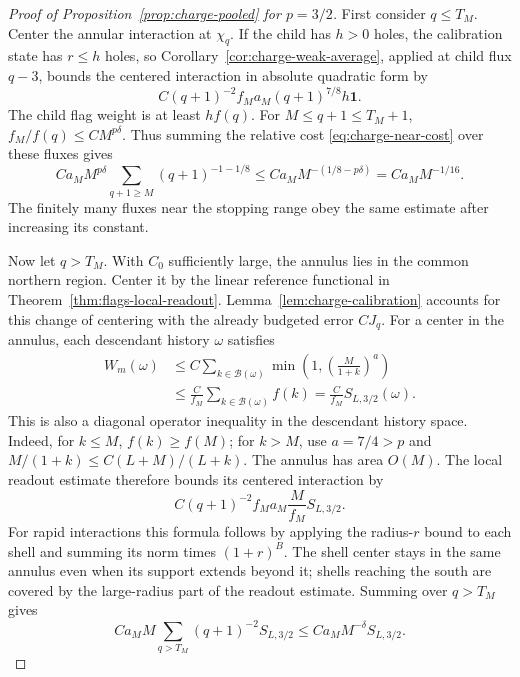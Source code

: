 \begin{proof}[Proof of Proposition~\ref{prop:charge-pooled} for $p=3/2$]
First consider $q\le T_M$.  Center the annular interaction at
$\chi_q$.  If the child has $h>0$ holes, the calibration state has
$r\le h$ holes, so Corollary~\ref{cor:charge-weak-average}, applied
at child flux $q-3$, bounds the centered interaction in absolute
quadratic form by
\begin{equation}\label{eq:charge-near-cost}
 C(q+1)^{-2}f_M a_M(q+1)^{7/8}h\mathbf1.
\end{equation}
The child flag weight is at least $hf(q)$.
For $M\le q+1\le T_M+1$,
$f_M/f(q)\le C M^{p\delta}$.  Thus summing the relative cost
\eqref{eq:charge-near-cost} over these fluxes gives
\begin{equation}\label{eq:charge-near-sum}
 C a_M M^{p\delta}\sum_{q+1\ge M}(q+1)^{-1-1/8}
 \le C a_M M^{-(1/8-p\delta)}
 =C a_M M^{-1/16}.
\end{equation}
The finitely many fluxes near the stopping range obey the same
estimate after increasing its constant.

Now let $q>T_M$.  With $C_0$ sufficiently large, the annulus lies
in the common northern region.  Center it by the linear reference
functional in Theorem~\ref{thm:flags-local-readout}.
Lemma~\ref{lem:charge-calibration} accounts for this change of
centering with the already budgeted error $CJ_q$.
For a center in the annulus, each descendant history $\omega$ satisfies
\begin{equation}\label{eq:charge-weight-comparison}
 \begin{split}
 W_m(\omega)
 &\le C\sum_{k\in\mathcal B(\omega)}
          \min\left(1,\left(\frac{M}{1+k}\right)^a\right)\\
 &\le\frac C{f_M}\sum_{k\in\mathcal B(\omega)}f(k)
  =\frac C{f_M}S_{L,3/2}(\omega).
 \end{split}
\end{equation}
This is also a diagonal operator inequality in the descendant history
space.
Indeed, for $k\le M$, $f(k)\ge f(M)$; for $k>M$, use $a=7/4>p$
and $M/(1+k)\le C(L+M)/(L+k)$.  The annulus has area $O(M)$.
The local readout estimate therefore bounds its centered
interaction by
\[
 C(q+1)^{-2} f_Ma_M\frac M{f_M}S_{L,3/2}.
\]
For rapid interactions this formula follows by applying the
radius-$r$ bound to each shell and summing its norm times
$(1+r)^B$.  The shell center stays in the same annulus even when
its support extends beyond it; shells reaching the south are
covered by the large-radius part of the readout estimate.
Summing over $q>T_M$ gives
\begin{equation}\label{eq:charge-far-sum}
 C a_M M\sum_{q>T_M}(q+1)^{-2}S_{L,3/2}
 \le C a_M M^{-\delta}S_{L,3/2}.
\end{equation}


\end{proof}
